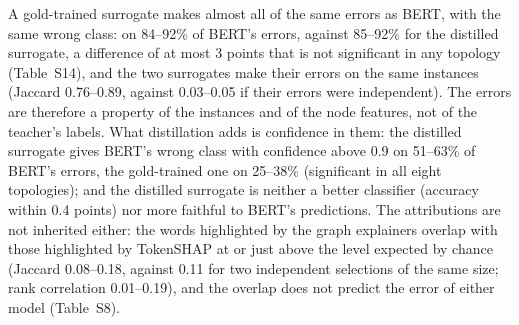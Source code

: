\begin{table}[H]
\centering
\scriptsize
\setlength{\tabcolsep}{4pt}
\caption{Gold-trained control. For each topology, the distilled surrogate (trained on the teacher's labels) and the gold-trained surrogate (same graphs, node features, architecture and protocol, trained on the gold labels) are compared against BERT's gold-label errors on the test split: accuracy with respect to the gold labels; fraction of BERT's errors on which the surrogate predicts the same wrong class as BERT; fraction of BERT's errors on which it does so with confidence above 0.9. \(^{*}\): the 95\% paired-bootstrap interval of the difference between the two surrogates excludes zero (intervals in Table~S14). A seed replicate of each surrogate does not narrow the gap (Table~S9).}
\label{tab:control}
\end{table}

A gold-trained surrogate makes almost all of the same errors as BERT, with the same wrong class: on 84--92\% of BERT's errors, against 85--92\% for the distilled surrogate, a difference of at most 3 points that is not significant in any topology (Table~S14), and the two surrogates make their errors on the same instances (Jaccard 0.76--0.89, against 0.03--0.05 if their errors were independent). The errors are therefore a property of the instances and of the node features, not of the teacher's labels. What distillation adds is confidence in them: the distilled surrogate gives BERT's wrong class with confidence above 0.9 on 51--63\% of BERT's errors, the gold-trained one on 25--38\% (significant in all eight topologies); and the distilled surrogate is neither a better classifier (accuracy within 0.4 points) nor more faithful to BERT's predictions. The attributions are not inherited either: the words highlighted by the graph explainers overlap with those highlighted by TokenSHAP at or just above the level expected by chance (Jaccard 0.08--0.18, against 0.11 for two independent selections of the same size; rank correlation 0.01--0.19), and the overlap does not predict the error of either model (Table~S8).

